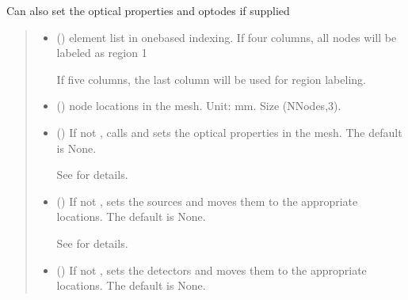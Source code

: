\documentclass[letterpaper,10pt,english]{sphinxmanual}
\begin{document}
\begin{fulllineitems}
\begin{fulllineitems}
\sphinxAtStartPar
Can also set the optical properties and optodes if supplied
\begin{quote}\begin{description}
\begin{itemize}
\item {} 
\sphinxAtStartPar
{} () \textendash{} 
\sphinxAtStartPar
element list in one\sphinxhyphen{}based indexing. If four columns, all nodes will be labeled as region 1

\sphinxAtStartPar
If five columns, the last column will be used for region labeling.


\item {} 
\sphinxAtStartPar
{} () \textendash{} node locations in the mesh. Unit: mm. Size (NNodes,3).

\item {} 
\sphinxAtStartPar
{} (\sphinxstyleliteralemphasis{\sphinxupquote{, }}) \textendash{} 
\sphinxAtStartPar
If not , calls  and sets the optical properties in the mesh. The default is None.

\sphinxAtStartPar
See {\hyperref[\detokenize{_autosummary/nirfasterff.base.fluor_mesh.fluormesh:nirfasterff.base.fluor_mesh.fluormesh.set_prop}]{}} for details.


\item {} 
\sphinxAtStartPar
{} (\sphinxstyleliteralemphasis{\sphinxupquote{, }}) \textendash{} 
\sphinxAtStartPar
If not , sets the sources and moves them to the appropriate locations. The default is None.

\sphinxAtStartPar
See {\hyperref[\detokenize{_autosummary/nirfasterff.base.optodes.optode:nirfasterff.base.optodes.optode.touch_sources}]{}} for details.


\item {} 
\sphinxAtStartPar
{} (\sphinxstyleliteralemphasis{\sphinxupquote{, }}) \textendash{} 
\sphinxAtStartPar
If not , sets the detectors and moves them to the appropriate locations. The default is None.


\end{itemize}
\end{description}
\end{quote}
\end{fulllineitems}
\end{fulllineitems}
\end{document}
